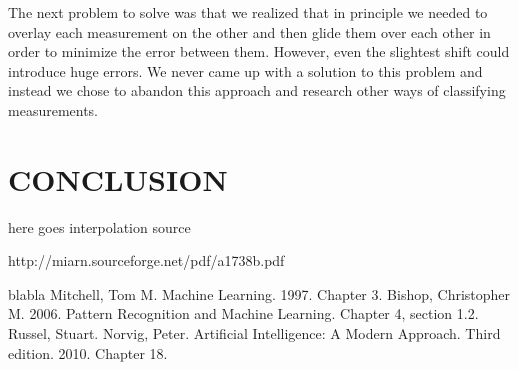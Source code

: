 \documentclass[a4paper, 10pt, conference]{ieeeconf}      %
\begin{document}
The next problem to solve was that we realized that in principle we needed to overlay each measurement on the other and then glide them over each other in order to minimize the error between them. However, even the slightest shift could introduce huge errors. We never came up with a solution to this problem and instead we chose to abandon this approach and research other ways of classifying measurements.

\section{CONCLUSION}




















\begin{thebibliography}{}
 here goes interpolation source

 http://miarn.sourceforge.net/pdf/a1738b.pdf

blabla
 Mitchell, Tom M. Machine Learning. 1997. Chapter 3.
 Bishop, Christopher M. 2006. Pattern Recognition and Machine Learning. Chapter 4, section 1.2.
 Russel, Stuart. Norvig, Peter. Artificial Intelligence: A Modern Approach. Third edition. 2010. Chapter 18. 
\end{thebibliography}
\end{document}
